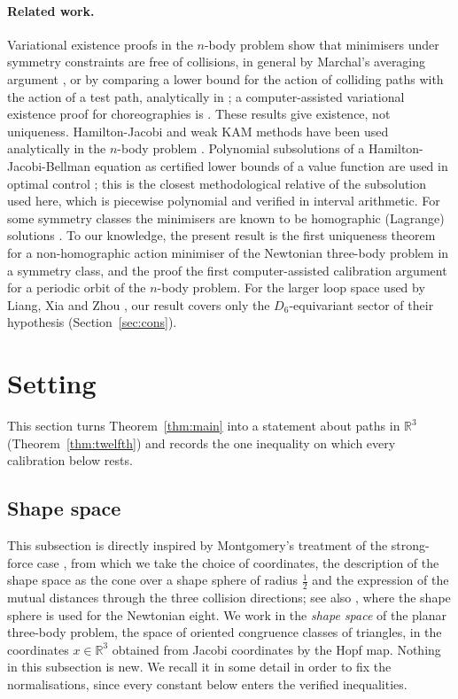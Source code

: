 \documentclass[11pt]{article}
\theoremstyle{definition}
\begin{document}
\paragraph{Related work.} Variational existence proofs in the $n$-body problem show that minimisers under symmetry
constraints are free of collisions, in general by Marchal's averaging argument \cite{Marchal,FT}, or by comparing a
lower bound for the action of colliding paths with the action of a test path, analytically in
\cite{Chen08,Shibayama14}; a computer-assisted variational existence proof for choreographies is \cite{ABT}. These
results give existence, not uniqueness. Hamilton-Jacobi and weak KAM methods have been used analytically in the
$n$-body problem \cite{MV20}. Polynomial subsolutions of a Hamilton-Jacobi-Bellman equation as certified lower bounds
of a value function are used in optimal control \cite{LHPT}; this is the closest methodological relative of the
subsolution used here, which is piecewise polynomial and verified in interval arithmetic. For some symmetry classes the minimisers are known to be homographic (Lagrange) solutions
\cite{BFT}. To our knowledge, the present result is the first uniqueness theorem for a non-homographic action
minimiser of the Newtonian three-body problem in a symmetry class, and the proof the first computer-assisted
calibration argument for a periodic orbit of the $n$-body problem. For the larger loop space used by Liang, Xia and
Zhou \cite{LXZ}, our result covers only the $D_6$-equivariant sector of their hypothesis (Section~\ref{sec:cons}).

\section{Setting}\label{sec:setting}
This section turns Theorem~\ref{thm:main} into a statement about paths in $\mathbb R^3$ (Theorem~\ref{thm:twelfth}) and
records the one inequality on which every calibration below rests.

\subsection{Shape space}\label{sec:shape}
This subsection is directly inspired by Montgomery's treatment of the strong-force case \cite[\S\S3 and~5.1]{Mpants},
from which we take the choice of coordinates, the description of the shape space as the cone over a shape sphere of
radius $\tfrac12$ and the expression of the mutual distances through the three collision directions; see also
\cite{CM}, where the shape sphere is used for the Newtonian eight. We work in the \emph{shape space} of the planar
three-body problem, the space of oriented congruence classes of triangles, in the coordinates $x\in\mathbb R^3$
obtained from Jacobi coordinates by the Hopf map. Nothing in this subsection is new. We recall it in some detail in
order to fix the normalisations, since every constant below enters the verified inequalities.
\end{document}
